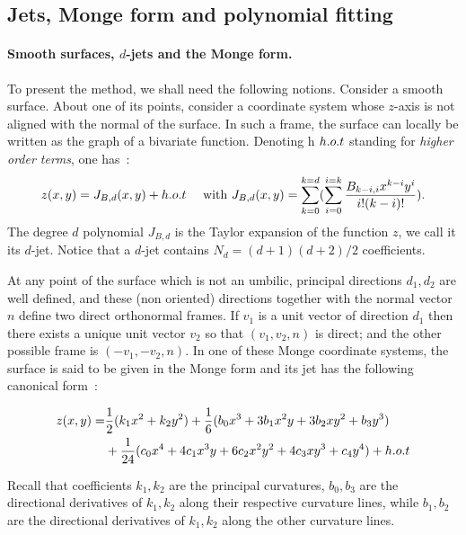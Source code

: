 \subsection{Jets, Monge form and polynomial fitting}

\paragraph{Smooth surfaces, $d$-jets and the Monge form.}
%
To present the method, we shall need the following notions. Consider a
smooth surface.  About one of its points, consider a coordinate system
whose $z$-axis is not aligned with the normal of the surface. In such
a frame, the surface can locally be written as the graph of a
bivariate function. Denoting h $h.o.t$ standing for {\em
higher order terms}, one has~:
%
\begin{equation}
z(x,y)=J_{B,d}(x,y) + h.o.t \quad \text{ with }
J_{B,d}(x,y)=\sum_{k=0}^{k=d}(\sum_{i=0}^{i=k}
\frac{B_{k-i,i}x^{k-i}y^{i}}{i!(k-i)!}).
\end{equation}
The degree $d$ polynomial $J_{B,d}$ is the Taylor expansion of the
function $z$, we call it its $d$-jet. Notice that a $d$-jet contains
$N_d=(d+1)(d+2)/2$ coefficients.

At any point of the surface which is not an umbilic, principal
directions $d_1, d_2$ are well defined, and these (non oriented)
directions together with the normal vector $n$ define two direct
orthonormal frames. If $v_1$ is a unit vector of direction $d_1$ then
there exists a unique unit vector $v_2$ so that $(v_1,v_2,n)$ is
direct; and the other possible frame is $(-v_1,-v_2,n)$. In one of
these Monge coordinate systems, the surface is said to be given in the
Monge form and its jet has the following canonical form~:

\begin{eqnarray}
\label{eq:monge}
z(x,y) =  & \frac{1}{2}(k_1x^2 + k_2y^2)+
	\frac{1}{6}(b_0x^3+3b_1x^2y+3b_2xy^2+b_3y^3) \\
  &  +\frac{1}{24}(c_0x^4+4c_1x^3y+6c_2x^2y^2+4c_3xy^3+c_4y^4) + h.o.t
\end{eqnarray}

Recall that coefficients $k_1, k_2$ are the principal curvatures,
$b_0,b_3$ are the directional derivatives of $k_1,k_2$ along their
respective curvature lines, while $b_1,b_2$ are the directional
derivatives of $k_1,k_2$ along the other curvature lines.

